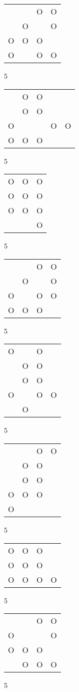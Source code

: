 \begin{tabular}{|m{0.2cm}m{0.2cm}m{0.2cm}m{0.2cm}|}\hline
 & &O&O\\
 &O& &O\\
O&O&O& \\
O& &O&O\\
\hline\end{tabular}5
\begin{tabular}{|m{0.2cm}m{0.2cm}m{0.2cm}m{0.2cm}m{0.2cm}|}\hline
 &O&O& & \\
 &O&O& & \\
O& & &O&O\\
O&O&O& & \\
\hline\end{tabular}5
\begin{tabular}{|m{0.2cm}m{0.2cm}m{0.2cm}|}\hline
O&O&O\\
O&O&O\\
O&O&O\\
 & &O\\
\hline\end{tabular}5
\begin{tabular}{|m{0.2cm}m{0.2cm}m{0.2cm}m{0.2cm}|}\hline
 & &O&O\\
 &O& &O\\
O& &O&O\\
O&O&O& \\
\hline\end{tabular}5
\begin{tabular}{|m{0.2cm}m{0.2cm}m{0.2cm}m{0.2cm}|}\hline
O& &O& \\
 &O&O& \\
 &O&O& \\
O& &O&O\\
 &O& & \\
\hline\end{tabular}5
\begin{tabular}{|m{0.2cm}m{0.2cm}m{0.2cm}m{0.2cm}|}\hline
 & &O&O\\
 &O&O& \\
 &O&O& \\
O&O&O& \\
O& & & \\
\hline\end{tabular}5
\begin{tabular}{|m{0.2cm}m{0.2cm}m{0.2cm}m{0.2cm}|}\hline
O&O&O& \\
O&O&O& \\
O&O&O&O\\
\hline\end{tabular}5
\begin{tabular}{|m{0.2cm}m{0.2cm}m{0.2cm}m{0.2cm}|}\hline
 & &O&O\\
O& & &O\\
O&O&O& \\
 &O&O&O\\
\hline\end{tabular}5
